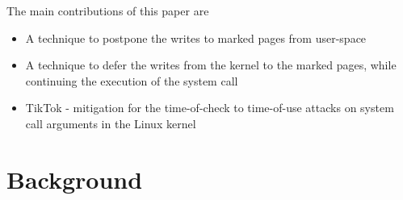 The main contributions of this paper are
\begin{itemize}
\item A technique to postpone the writes to marked pages from user-space
\item A technique to defer the writes from the kernel to the marked pages,
      while continuing the execution of the system call
\item TikTok - mitigation for the time-of-check to time-of-use attacks on system 
      call arguments in the Linux kernel
\end{itemize}




\section{Background}
\label{sec:background}


